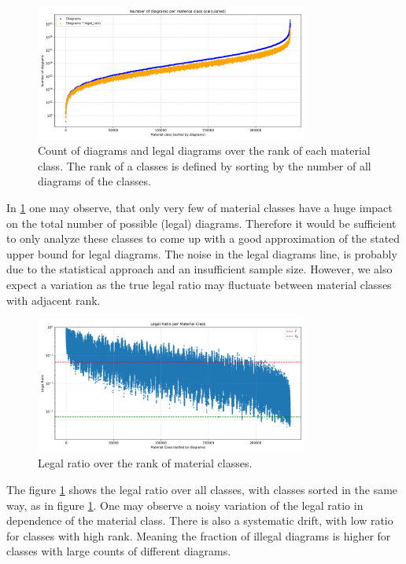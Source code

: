 \documentclass[12pt]{article}
\begin{document}
\begin{figure}[h!]
  \centering
  \includegraphics[width=0.8\textwidth]{diagrams_per_class.png}
  \caption{Count of diagrams and legal diagrams over the rank of each material class. The rank of a classes is defined by sorting by the number of all diagrams of the classes.}
  \label{fig:diagrams_per_class}
\end{figure}
In \ref{fig:diagrams_per_class} one may observe, that only very few of material classes have a huge impact on the total number of possible (legal) diagrams. Therefore it would be sufficient to only analyze these classes to come up with a good approximation of the stated upper bound for legal diagrams. The noise in the legal diagrams line, is probably due to the statistical approach and an insufficient sample size. However, we also expect a variation as the true legal ratio may fluctuate between material classes with adjacent rank.

\begin{figure}[h!]
  \centering
  \includegraphics[width=0.8\textwidth]{legal_ratio_per_class.png}
  \caption{Legal ratio over the rank of material classes.}
  \label{fig:legal_ratio_by_class}
\end{figure}

The figure \ref{fig:diagrams_per_class} shows the legal ratio over all classes, with classes sorted in the same way, as in figure \ref{fig:diagrams_per_class}. One may observe a noisy variation of the legal ratio in dependence of the material class. There is also a systematic drift, with low ratio for classes with high rank. Meaning the fraction of illegal diagrams is higher for classes with large counts of different diagrams.
\end{document}
